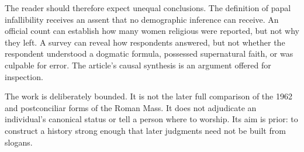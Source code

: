 {The reader should therefore expect unequal conclusions. The definition of papal infallibility receives an assent that no demographic inference can receive. An official count can establish how many women religious were reported, but not why they left. A survey can reveal how respondents answered, but not whether the respondent understood a dogmatic formula, possessed supernatural faith, or was culpable for error. The article's causal synthesis is an argument offered for inspection.

The work is deliberately bounded. It is not the later full comparison of the 1962 and postconciliar forms of the Roman Mass. It does not adjudicate an individual's canonical status or tell a person where to worship. Its aim is prior: to construct a history strong enough that later judgments need not be built from slogans.

}
